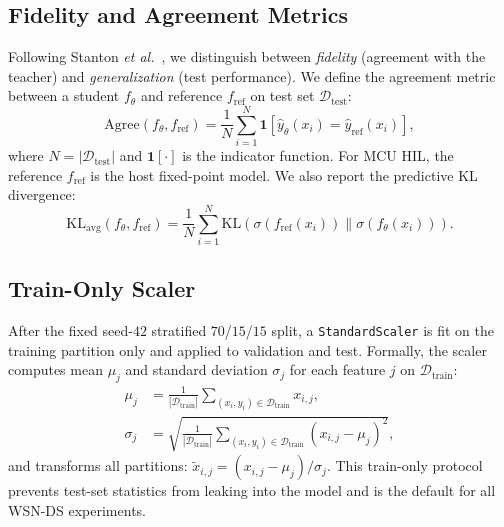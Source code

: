 \documentclass[journal]{IEEEtran}
\begin{document}
\subsection{Fidelity and Agreement Metrics}
\label{sec:fidelity}
Following Stanton \emph{et al.}~\cite{stanton2021kd}, we distinguish between \emph{fidelity} (agreement with the teacher) and \emph{generalization} (test performance).
We define the agreement metric between a student $f_\theta$ and reference $f_{\mathrm{ref}}$ on test set $\mathcal{D}_{\mathrm{test}}$:
{\begin{equation}
\mathrm{Agree}(f_\theta, f_{\mathrm{ref}}) = \frac{1}{N} \sum_{i=1}^{N} \mathbf{1}\!\left[\hat{y}_\theta(x_i) = \hat{y}_{\mathrm{ref}}(x_i)\right],
\end{equation}}
where $N = |\mathcal{D}_{\mathrm{test}}|$ and $\mathbf{1}[\cdot]$ is the indicator function.
For MCU HIL, the reference $f_{\mathrm{ref}}$ is the host fixed-point model.
We also report the predictive KL divergence:
\begin{equation}
\mathrm{KL}_{\mathrm{avg}}(f_\theta, f_{\mathrm{ref}}) = \frac{1}{N} \sum_{i=1}^{N} \mathrm{KL}\!\left(\sigma(f_{\mathrm{ref}}(x_i)) \| \sigma(f_\theta(x_i))\right).
\end{equation}

\subsection{Train-Only Scaler}
\label{sec:train-only}
After the fixed seed-$42$ stratified $70$/$15$/$15$ split, a \texttt{StandardScaler} is fit on the training partition only and applied to validation and test.
Formally, the scaler computes mean $\mu_j$ and standard deviation $\sigma_j$ for each feature $j$ on $\mathcal{D}_{\mathrm{train}}$:
\begin{align}
\mu_j &= \frac{1}{|\mathcal{D}_{\mathrm{train}}|} \sum_{(x_i, y_i) \in \mathcal{D}_{\mathrm{train}}} x_{i,j}, \\
\sigma_j &= \sqrt{\frac{1}{|\mathcal{D}_{\mathrm{train}}|} \sum_{(x_i, y_i) \in \mathcal{D}_{\mathrm{train}}} (x_{i,j} - \mu_j)^2},
\end{align}
and transforms all partitions: $\tilde{x}_{i,j} = (x_{i,j} - \mu_j) / \sigma_j$.
This train-only protocol prevents test-set statistics from leaking into the model and is the default for all WSN-DS experiments.
\end{document}
